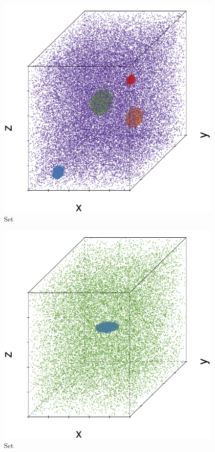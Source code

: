 \begin{subfigure}{0.18\textwidth}
	\centering
	\includegraphics[width=\textwidth]{3/img/datasetplot_ferdosi_3_120000.pdf}
	\caption{Set \ferdosiThree}
	\label{fig:3:simulated:datasets:ferdosi3}
\end{subfigure}	
\begin{subfigure}{0.18\textwidth}
	\centering
	\includegraphics[width=\textwidth]{3/img/datasetplot_baakman_4_60000.pdf}
	\caption{Set \baakmanFour}
	\label{fig:3:simulated:datasets:baakman4}
\end{subfigure}	
